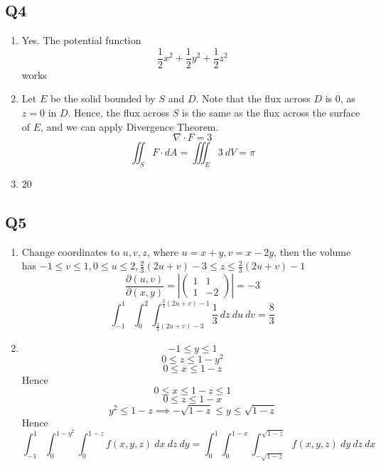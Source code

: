 \documentclass{article}
\newcommand{\p}[2]{\frac{\partial #1}{\partial #2}}
\newcommand{\abs}[1]{\left| #1 \right|}
\begin{document}
\subsection*{Q4}

\begin{enumerate}[label=\alph*.]
\item Yes. The potential function
\[\frac{1}{2}x^2 + \frac{1}{2}y^2 + \frac{1}{2}z^2\]
works
\item Let $E$ be the solid bounded by $S$ and $D$. Note that the flux across $D$ is $0$, as $z=0$ in $D$. Hence, the flux across $S$ is the same as the flux across the surface of $E$, and we can apply Divergence Theorem.
\[\nabla \cdot F = 3\]
\[\iint_S F\cdot dA = \iiint_E 3\ dV = \pi\]
\item 20
\end{enumerate}

\subsection*{Q5}

\begin{enumerate}[label=\alph*.]
\item Change coordinates to $u,v,z$, where $u=x+y, v=x-2y$, then the volume has $-1 \leq v \leq 1, 0 \leq u \leq 2, \frac{2}{3}(2u+v) -3 \leq z \leq \frac{2}{3}(2u+v) -1$
\[\p{(u,v)}{(x,y)} = \abs{\begin{pmatrix}
1 & 1 \\ 1 & -2
\end{pmatrix}} = -3\]
\[
\int_{-1}^1 \int_0^2 \int_{\frac{2}{3}(2u+v)-3}^{\frac{2}{3}(2u+v) -1} \frac{1}{3}\ dz\ du\ dv = \frac{8}{3}
\]

\item
\[-1 \leq y \leq 1\]
\[0 \leq z \leq 1-y^2\]
\[0 \leq x \leq 1-z\]
Hence
\[0 \leq x \leq 1-z \leq 1\]
\[0 \leq z \leq 1-x\]
\[y^2 \leq 1-z \implies -\sqrt{1-z} \leq y \leq \sqrt{1-z}\]
Hence
\[\int_{-1}^{1} \int_0^{1-y^2} \int_0^{1-z} f(x,y,z)\ dx\ dz\ dy = \int_0^1 \int_0^{1-x} \int_{-\sqrt{1-z}}^{\sqrt{1-z}} f(x,y,z)\ dy\ dz\ dx\]
\end{enumerate}
\end{document}
